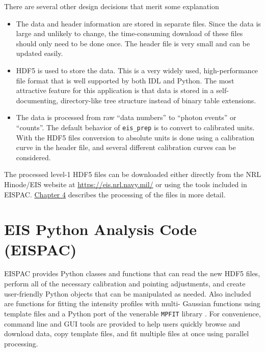 There are several other design decisions that merit some explanation

\begin{itemize}
  \item The data and header information are stored in separate files. Since the data is large and
    unlikely to change, the time-consuming download of these files should only need to be done
    once. The header file is very small and can be updated easily.
  \item HDF5 is used to store the data. This is a very widely used, high-performance file format
    that is well supported by both IDL and Python. The most attractive feature for this application
    is that data is stored in a self-documenting, directory-like tree structure instead of binary
    table extensions.
  \item The data is processed from raw ``data numbers'' to ``photon events'' or ``counts''. The
    default behavior of \verb+eis_prep+ is to convert to calibrated units. With the HDF5 files
    conversion to absolute units is done using a calibration curve in the header file, and several
    different calibration curves can be considered.
\end{itemize}

The processed level-1 HDF5 files can be downloaded either directly from the NRL Hinode/EIS website at \url{https://eis.nrl.navy.mil/} or using the tools included in EISPAC. \hyperref[sec:prep]{Chapter 4} describes the processing of the files in more detail.

\section{EIS Python Analysis Code (EISPAC)}
EISPAC provides Python classes and functions that can read the new HDF5 files, perform all of the
necessary calibration and pointing adjustments, and create user-friendly Python objects that can be
manipulated as needed. Also included are functions for fitting the intensity profiles with multi-
Gaussian functions using template files and a Python port of the venerable \verb+MPFIT+ library
\citep{Markwardt:2009}. For convenience, command line and GUI tools are provided to help users quickly
browse and download data, copy template files, and fit multiple files at once using parallel
processing.

